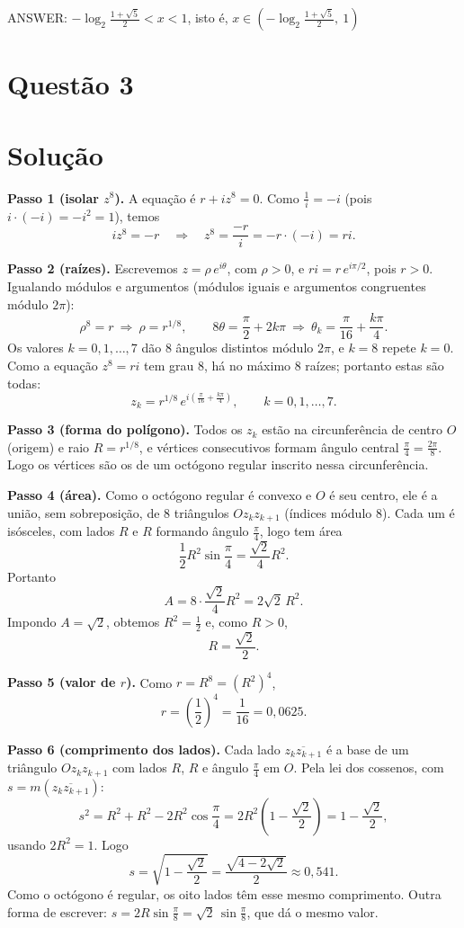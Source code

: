 \documentclass{article}%
\begin{document}
ANSWER: $-\log_2\frac{1+\sqrt{5}}{2}<x<1$, isto é, $x\in\left(-\log_2\frac{1+\sqrt{5}}{2},\ 1\right)$%
\newpage%
\section*{Questão 3}

\section*{Solução}

\textbf{Passo 1 (isolar $z^8$).} A equação é $r+iz^8=0$. Como $\frac{1}{i}=-i$ (pois $i\cdot(-i)=-i^2=1$), temos
\[
iz^8=-r \quad\Rightarrow\quad z^8=\frac{-r}{i}=-r\cdot(-i)=ri .
\]

\textbf{Passo 2 (raízes).} Escrevemos $z=\rho\,e^{i\theta}$, com $\rho>0$, e $ri=r\,e^{i\pi/2}$, pois $r>0$. Igualando módulos e argumentos (módulos iguais e argumentos congruentes módulo $2\pi$):
\[
\rho^8=r\ \Rightarrow\ \rho=r^{1/8}, \qquad 8\theta=\frac{\pi}{2}+2k\pi\ \Rightarrow\ \theta_k=\frac{\pi}{16}+\frac{k\pi}{4}.
\]
Os valores $k=0,1,\dots,7$ dão 8 ângulos distintos módulo $2\pi$, e $k=8$ repete $k=0$. Como a equação $z^8=ri$ tem grau 8, há no máximo 8 raízes; portanto estas são todas:
\[
z_k=r^{1/8}\,e^{i\left(\frac{\pi}{16}+\frac{k\pi}{4}\right)}, \qquad k=0,1,\dots,7.
\]

\textbf{Passo 3 (forma do polígono).} Todos os $z_k$ estão na circunferência de centro $O$ (origem) e raio $R=r^{1/8}$, e vértices consecutivos formam ângulo central $\frac{\pi}{4}=\frac{2\pi}{8}$. Logo os vértices são os de um octógono regular inscrito nessa circunferência.

\textbf{Passo 4 (área).} Como o octógono regular é convexo e $O$ é seu centro, ele é a união, sem sobreposição, de 8 triângulos $Oz_kz_{k+1}$ (índices módulo 8). Cada um é isósceles, com lados $R$ e $R$ formando ângulo $\frac{\pi}{4}$, logo tem área
\[
\frac{1}{2}R^2\sin\frac{\pi}{4}=\frac{\sqrt{2}}{4}R^2 .
\]
Portanto
\[
A=8\cdot\frac{\sqrt{2}}{4}R^2=2\sqrt{2}\,R^2 .
\]
Impondo $A=\sqrt{2}$, obtemos $R^2=\frac{1}{2}$ e, como $R>0$,
\[
R=\frac{\sqrt{2}}{2}.
\]

\textbf{Passo 5 (valor de $r$).} Como $r=R^8=\left(R^2\right)^4$,
\[
r=\left(\frac{1}{2}\right)^4=\frac{1}{16}=0{,}0625 .
\]

\textbf{Passo 6 (comprimento dos lados).} Cada lado $\overline{z_kz_{k+1}}$ é a base de um triângulo $Oz_kz_{k+1}$ com lados $R$, $R$ e ângulo $\frac{\pi}{4}$ em $O$. Pela lei dos cossenos, com $s=m(\overline{z_kz_{k+1}})$:
\[
s^2=R^2+R^2-2R^2\cos\frac{\pi}{4}=2R^2\left(1-\frac{\sqrt{2}}{2}\right)=1-\frac{\sqrt{2}}{2},
\]
usando $2R^2=1$. Logo
\[
s=\sqrt{1-\frac{\sqrt{2}}{2}}=\frac{\sqrt{4-2\sqrt{2}}}{2}\approx 0{,}541 .
\]
Como o octógono é regular, os oito lados têm esse mesmo comprimento. Outra forma de escrever: $s=2R\sin\frac{\pi}{8}=\sqrt{2}\,\sin\frac{\pi}{8}$, que dá o mesmo valor.
\end{document}
